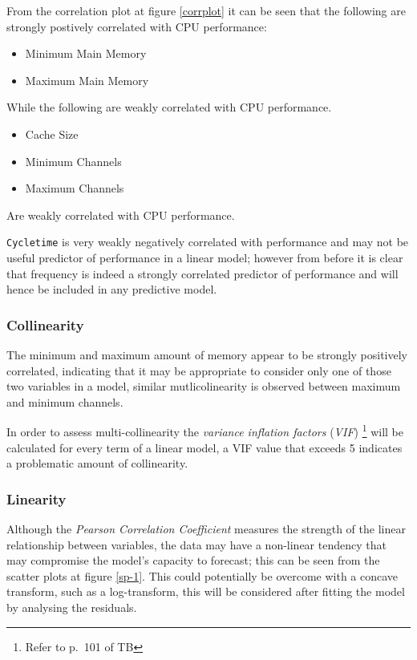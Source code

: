 \documentclass[
]{article}
\newcommand{\passthrough}[1]{#1}
\providecommand{\tightlist}{%
  \setlength{\itemsep}{0pt}\setlength{\parskip}{0pt}}
\begin{document}
From the correlation plot at figure \ref{corrplot} it can be seen that the
following are strongly postively correlated with CPU performance:

\begin{itemize}
\tightlist
\item
  Minimum Main Memory
\item
  Maximum Main Memory
\end{itemize}

While the following are weakly correlated with CPU performance.

\begin{itemize}
\tightlist
\item
  Cache Size
\item
  Minimum Channels
\item
  Maximum Channels
\end{itemize}

Are weakly correlated with CPU performance.

\passthrough{\lstinline!Cycletime!} is very weakly negatively correlated
with performance and may not be useful predictor of performance in a linear model; however
from before it is clear that frequency is indeed a strongly correlated
predictor of performance and will hence be included in any predictive
model.

\hypertarget{collinearity}{%
\subsubsection{Collinearity}\label{collinearity}}

The minimum and maximum amount of memory appear to be strongly
positively correlated, indicating that it may be appropriate to consider
only one of those two variables in a model, similar mutlicolinearity is
observed between maximum and minimum channels.

In order to assess multi-collinearity the \emph{variance inflation
factors} (\emph{VIF}) \footnote{Refer to p.~101 of TB} will be
calculated for every term of a linear model, a VIF value that exceeds 5
indicates a problematic amount of collinearity.

\hypertarget{linearity}{%
\subsubsection{Linearity}\label{linearity}}

Although the \emph{Pearson Correlation Coefficient} measures the
strength of the linear relationship between variables, the data may have
a non-linear tendency that may compromise the model's capacity to
forecast; this can be seen from the scatter plots at figure \ref{sp-1}. 
This could potentially be overcome with a concave transform, such as a
log-transform, this will be considered after fitting the model by
analysing the residuals.
\end{document}
